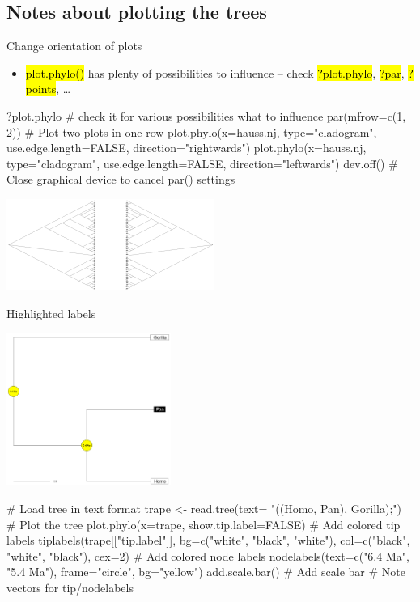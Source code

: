 \documentclass[compress, ucs, xelatex, 11pt, xcolor=svgnames,
  hyperref={
    bookmarks=true,
    unicode=true,
    colorlinks=true,
    pdftitle={Molecular data in R},
    plainpages=false,
    pdfauthor={Vojtech Zeisek},
    pdfsubject={Course about phylogeny and evolution in R},
    pdfcreator={XeLaTeX},
    pdfkeywords={R, evolution, phylogeny, molecular data},
    linkcolor=Tomato,
    anchorcolor=SaddleBrown,
    citecolor=Goldenrod,
    filecolor=DarkMagenta,
    menucolor=Sienna,
    urlcolor=DarkTurquoise,
    pdftex},
  url={hyphens, lowtilde} %
  ]{beamer}
\renewcommand{\texttt}[1]{\hl{\ttfamily #1}}
\begin{document}
\subsection{Notes about plotting the trees}

\begin{frame}[fragile]{Change orientation of plots}
  \begin{itemize}
    \item \alert{\texttt{plot.phylo()} has plenty of possibilities to influence -- check \texttt{?plot.phylo}, \texttt{?par}, \texttt{?points}, \ldots}
  \end{itemize}
  \begin{spluscode}
    ?plot.phylo # check it for various possibilities what to influence
    par(mfrow=c(1, 2)) # Plot two plots in one row
    plot.phylo(x=hauss.nj, type="cladogram", use.edge.length=FALSE,
      direction="rightwards")
    plot.phylo(x=hauss.nj, type="cladogram", use.edge.length=FALSE,
      direction="leftwards")
    dev.off() # Close graphical device to cancel par() settings
  \end{spluscode}
\begin{center}
  \includegraphics[height=3cm]{lr.png}
\end{center}
\end{frame}

\begin{frame}[fragile]{Highlighted labels}
\begin{multicols}{2}
  \includegraphics[height=5cm]{highlight.png}
  \columnbreak
  \begin{spluscode}
    # Load tree in text format
    trape <- read.tree(text=
      "((Homo, Pan), Gorilla);")
    # Plot the tree
    plot.phylo(x=trape,
      show.tip.label=FALSE)
    # Add colored tip labels
    tiplabels(trape[["tip.label"]],
      bg=c("white", "black",
      "white"), col=c("black",
      "white", "black"), cex=2)
    # Add colored node labels
    nodelabels(text=c("6.4 Ma",
      "5.4 Ma"), frame="circle",
      bg="yellow")
    add.scale.bar() # Add scale bar
    # Note vectors for tip/nodelabels
  \end{spluscode}
\end{multicols}
\end{frame}
\end{document}
